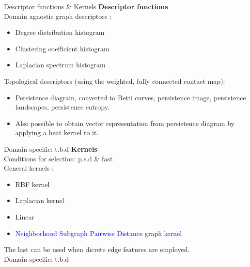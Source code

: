 \documentclass[aspectratio=169, 10pt, dvipsnames, handout]{beamer}
\begin{document}
\begin{frame}[fragile]{Descriptor functions \& Kernels}
  \textbf{Descriptor functions} \\
  Domain agnostic graph descriptors \cite{o2021evaluation}:
  \begin{itemize}
  \item Degree distribution histogram
  \item Clustering coefficient histogram
  \item Laplacian spectrum histogram
  \end{itemize}

  Topological descriptors (using the weighted, fully connected contact map):
  \begin{itemize}
  \item Persistence diagram, converted to Betti curves, persistence image, persistence landscapes, persistence entropy. \cite{tauzin2021giotto}
  \item Also possible to obtain vector representation from persistence diagram by applying a heat kernel to it. \cite{reininghaus2015stable}
  \end{itemize}

  Domain specific: t.b.d
  \endminipage
  \hfill\vline\hfill
  \endminipage
  \textbf{Kernels} \\
  Conditions for selection: p.s.d \& fast\\
  General kernels \cite{o2021evaluation}:
    \begin{itemize}
    \item RBF kernel
    \item Laplacian kernel
    \item Linear
    \item \textcolor{blue}{Neighborhood Subgraph Pairwise Distance graph kernel} \cite{costa2010fast}
    \end{itemize}
    The last can be used when dicrete edge features are employed.\\
  Domain specific: t.b.d
  \endminipage
\end{frame}
\end{document}
